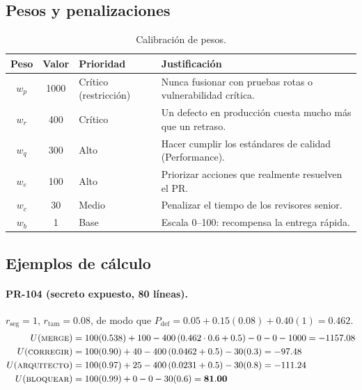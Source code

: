 \documentclass[11pt,a4paper]{article}
\newcommand{\Pdef}{P_{\text{def}}}
\begin{document}
\subsection{Pesos y penalizaciones}

\begin{table}[H]
\centering
\caption{Calibración de pesos.}
\label{tab:pesos}
\begin{tabularx}{\textwidth}{@{}c c l X@{}}
\toprule
\textbf{Peso} & \textbf{Valor} & \textbf{Prioridad} & \textbf{Justificación} \\
\midrule
$w_p$ & 1000 & Crítico (restricción) & Nunca fusionar con pruebas rotas o vulnerabilidad crítica. \\
$w_r$ & 400 & Crítico & Un defecto en producción cuesta mucho más que un retraso. \\
$w_q$ & 300 & Alto & Hacer cumplir los estándares de calidad (Performance). \\
$w_e$ & 100 & Alto & Priorizar acciones que realmente resuelven el PR. \\
$w_c$ & 30 & Medio & Penalizar el tiempo de los revisores senior. \\
$w_b$ & 1 & Base & Escala 0--100: recompensa la entrega rápida. \\
\bottomrule
\end{tabularx}
\end{table}

\subsection{Ejemplos de cálculo}

\paragraph{PR-104 (secreto expuesto, 80 líneas).} $r_{\text{seg}}=1$, $r_{\text{tam}}=0.08$, de
modo que $\Pdef = 0.05 + 0.15(0.08) + 0.40(1) = 0.462$.
\begin{align*}
U(\textsc{merge}) &= 100(0.538) + 100 - 400\,(0.462\cdot0.6 + 0.5) - 0 - 0 - 1000 = -1157.08\\
U(\textsc{corregir}) &= 100(0.90) + 40 - 400\,(0.0462 + 0.5) - 30(0.3) = -97.48\\
U(\textsc{arquitecto}) &= 100(0.97) + 25 - 400\,(0.0231 + 0.5) - 30(0.8) = -111.24\\
U(\textsc{bloquear}) &= 100(0.99) + 0 - 0 - 30(0.6) = \mathbf{81.00}
\end{align*}
\end{document}

